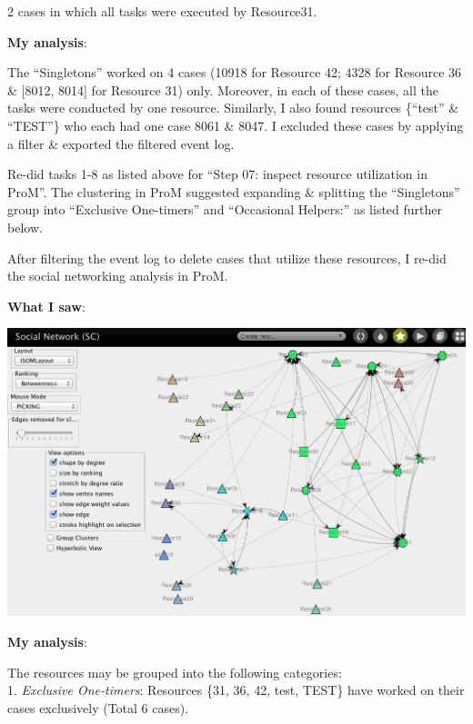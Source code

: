 \documentclass[]{article}
\begin{document}
2 cases in which all tasks were executed by Resource31.

\textbf{My analysis}:

The ``Singletons'' worked on 4 cases (10918 for Resource 42; 4328 for
Resource 36 \& {[}8012, 8014{]} for Resource 31) only. Moreover, in each
of these cases, all the tasks were conducted by one resource. Similarly,
I also found resources \{``test'' \& ``TEST''\} who each had one case
8061 \& 8047. I excluded these cases by applying a filter \& exported
the filtered event log.

Re-did tasks 1-8 as listed above for ``Step 07: inspect resource
utilization in ProM''. The clustering in ProM suggested expanding \&
splitting the ``Singletons'' group into ``Exclusive One-timers'' and
``Occasional Helpers:'' as listed further below.

After filtering the event log to delete cases that utilize these
resources, I re-did the social networking analysis in ProM.

\textbf{What I saw}:

\includegraphics{CoSeLoG_Step_07_excl_one-timers_SocialNet.png}

\textbf{My analysis}:

The resources may be grouped into the following categories:\\1.
\emph{Exclusive One-timers}: Resources \{31, 36, 42, test, TEST\} have
worked on their cases exclusively (Total 6 cases).
\end{document}
